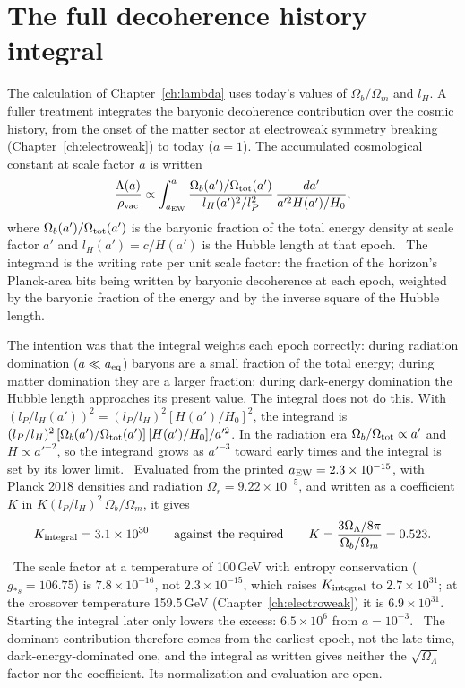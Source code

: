 \section{The full decoherence history integral}\label{sec:lh_integral}
The calculation of Chapter~\ref{ch:lambda} uses today's values of $\Omega_b/\Omega_m$ and $l_H$. A fuller treatment integrates the
baryonic decoherence contribution over the cosmic history, from the onset of the matter sector at electroweak symmetry breaking
(Chapter~\ref{ch:electroweak}) to today ($a=1$). The accumulated cosmological constant at scale factor $a$ is written
\begin{equation}
\frac{\Lambda(a)}{\rho_{\rm vac}}\propto\int_{a_{\rm EW}}^{a}\frac{\Omega_b(a')/\Omega_{\rm tot}(a')}{l_H(a')^2/l_P^2}\,
\frac{da'}{a'^2H(a')/H_0},\label{eq:lh_integral}
\end{equation}
where $\Omega_b(a')/\Omega_{\rm tot}(a')$ is the baryonic fraction of the total energy density at scale factor $a'$ and
$l_H(a')=c/H(a')$ is the Hubble length at that epoch. \conjecture\ The integrand is the writing rate per unit scale factor: the fraction
of the horizon's Planck-area bits being written by baryonic decoherence at each epoch, weighted by the baryonic fraction of the energy
and by the inverse square of the Hubble length.

The intention was that the integral weights each epoch correctly: during radiation domination ($a\ll a_{\rm eq}$) baryons are a small
fraction of the total energy; during matter domination they are a larger fraction; during dark-energy domination the Hubble length
approaches its present value. The integral does not do this. With $(l_P/l_H(a'))^2=(l_P/l_H)^2[H(a')/H_0]^2$, the integrand is
$(l_P/l_H)^2\,[\Omega_b(a')/\Omega_{\rm tot}(a')]\,[H(a')/H_0]/a'^2$. In the radiation era $\Omega_b/\Omega_{\rm tot}\propto a'$ and
$H\propto a'^{-2}$, so the integrand grows as $a'^{-3}$ toward early times and the integral is set by its lower limit. \derived\
Evaluated from the printed $a_{\rm EW}=2.3\times10^{-15}$, with Planck 2018 densities and radiation $\Omega_r=9.22\times10^{-5}$, and written
as a coefficient $K$ in $K(l_P/l_H)^2\,\Omega_b/\Omega_m$, it gives
\begin{equation}K_{\rm integral}=3.1\times10^{30}\qquad\text{against the required}\qquad K=\frac{3\Omega_\Lambda/8\pi}{\Omega_b/\Omega_m}=0.523 .
\label{eq:lh_K}\end{equation}
\calc\ The scale factor at a temperature of 100\,GeV with entropy conservation ($g_{*s}=106.75$) is $7.8\times10^{-16}$, not
$2.3\times10^{-15}$, which raises $K_{\rm integral}$ to $2.7\times10^{31}$; at the crossover temperature 159.5\,GeV
(Chapter~\ref{ch:electroweak}) it is $6.9\times10^{31}$. Starting the integral later only lowers the excess: $6.5\times10^6$ from
$a=10^{-3}$. \calc\ The dominant contribution therefore comes from the earliest epoch, not the late-time, dark-energy-dominated one, and
the integral as written gives neither the $\sqrt{\Omega_\Lambda}$ factor nor the coefficient. Its normalization and evaluation are
open. \openprob


